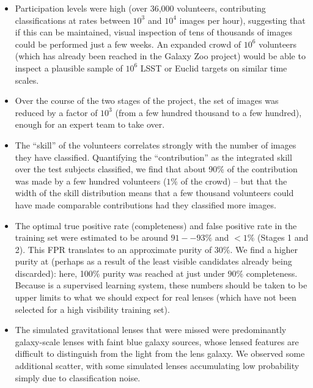\documentclass[useAMS,usenatbib,a4paper]{mn2e}
\begin{document}
\begin{itemize}

\item Participation levels were high (over 36,000 volunteers, contributing
classifications at rates between $10^3$ and $10^4$ images per hour), suggesting
that if this can be maintained, visual inspection of tens of thousands of images
could be performed just a few weeks. An expanded crowd of $10^6$ volunteers
(which has already been reached in the Galaxy Zoo project) would
be able to inspect a plausible sample of $10^6$ LSST or Euclid targets
on similar time scales.

\item Over the course of the two stages of the \cfhtls project, the
set of images was reduced by a factor of $10^3$ (from a few hundred thousand to
a few hundred), enough for an expert team to take over.

\item The ``skill'' of the volunteers correlates strongly with the number of
images they have classified.  Quantifying the ``contribution'' as the integrated
skill over the test subjects classified, we find that about 90\% of the
contribution was made by a few hundred volunteers ($1\%$ of the crowd) -- but
that the width of the skill distribution means that a  few thousand volunteers
could have made comparable contributions had they classified more images.

\item The optimal true positive rate (completeness) and false positive rate in
the training set were estimated to be around $91--93\%$ and $<1\%$ (Stages 1 and
2). This FPR translates to an approximate purity of 30\%. We find a
higher purity at \StageTwo (perhaps as a result of the least visible candidates already
being discarded): here, 100\% purity was reached at just under $90\%$
completeness. Because \SW is a supervised learning system, these numbers should
be taken to be upper limits to what we should expect for real lenses (which have
not been selected for a high visibility training set).

\item The simulated gravitational lenses that were missed were predominantly
galaxy-scale lenses with faint blue galaxy sources, whose lensed features are
difficult to distinguish from the light from the lens galaxy. We observed some
additional scatter, with some simulated lenses accumulating low probability
simply due to classification noise.

\end{itemize}
\end{document}
